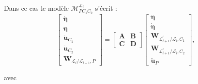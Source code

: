 Dans ce cas le mod\`ele $\mathcal{M}_{PC_1C_2}^{\mathcal{L}_i}$ s'\'ecrit :
\begin{equation}
	\left[\begin{array}{c} 
		\dot{\bm{\eta}} \\ \ddot{\bm{\eta}} \\ \hline
		\ddot{\mathbf{u}}_{C_1} \\ \ddot{\mathbf{u}}_{C_2} \\ \mathbf{W}_{\mathcal{L}_{i}/\mathcal{L}_{i-1},P}
	\end{array} \right] =
	\left[\begin{array}{c|c}
		\mathbf{A} & \mathbf{B} \\ \hline
		\mathbf{C} & \mathbf{D} 
	\end{array} \right]
	\left[\begin{array}{c} 
		\bm{\eta} \\ \dot{\bm{\eta}} \\ \hline \mathbf{W}_{\mathcal{L}_{i+1}^{'}/\mathcal{L}_{i},C_1} \\ \mathbf{W}_{\mathcal{L}_{i+1}^{''}/\mathcal{L}_{i},C_2} \\ \ddot{\mathbf{u}}_P
	\end{array} \right],	
	\label{eq:ninop_model_fr}
\end{equation}

avec


